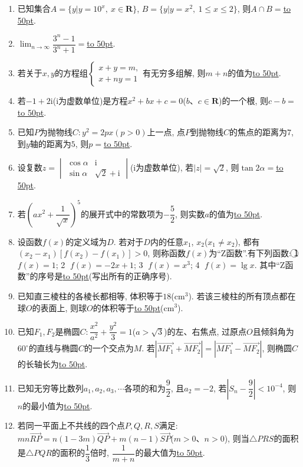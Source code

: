 \documentclass[10pt,a4paper]{article}
\newcommand{\blank}[1]{\underline{\hbox to #1pt{}}}
\begin{document}
\begin{enumerate}[1.]
\item 已知集合$A=\{y|y=10^x, \ x\in \mathbf{R}\}$, $B=\{y|y=x^2, \ 1\le x\le 2\}$, 则$A\cap B=$\blank{50}.
\item $\displaystyle\lim_{n\to\infty}\dfrac{3^n-1}{3^n+1}=$\blank{50}.
\item 若关于$x, y$的方程组$\begin{cases}x+y=m, \\ x+ny=1\end{cases}$有无穷多组解, 则$m+n$的值为\blank{50}.
\item 若$-1+2\mathrm{i}$($\mathrm{i}$为虚数单位)是方程$x^2+bx+c=0$($b$、$c\in \mathbf{R}$)的一个根, 则$c-b=$\blank{50}.
\item 已知$P$为抛物线$C:y^2=2px(p>0)$上一点, 点$P$到抛物线$C$的焦点的距离为$7$, 到$y$轴的距离为$5$, 则$p=$\blank{50}.
\item 设复数$z=\begin{vmatrix}\cos \alpha & \mathrm{i} \\ \sin \alpha  & \sqrt 2+\mathrm{i} \end{vmatrix}$($\mathrm{i}$为虚数单位), 若$|z|=\sqrt 2$, 则$\tan 2\alpha =$\blank{50}.
\item 若$(ax^2+\dfrac 1{\sqrt x})^{5}$的展开式中的常数项为$-\dfrac 5{2}$, 则实数$a$的值为\blank{50}.
\item 设函数$f(x)$的定义域为$D$. 若对于$D$内的任意$x_1$, $x_2$($x_1\ne x_2$), 都有$(x_2-x_1)[f(x_2)-f(x_1)]>0$, 则称函数$f(x)$为``Z函数''.有下列函数: \textcircled{1} $f(x)=1$; \textcircled{2} $f(x)=-2x+1$; \textcircled{3} $f(x)=x^3$; \textcircled{4} $f(x)=\lg x$. 其中``Z函数''的序号是\blank{50}(写出所有的正确序号).
\item 已知直三棱柱的各棱长都相等, 体积等于$18$($\text{cm}^3$). 若该三棱柱的所有顶点都在球$O$的表面上, 则球$O$的体积等于\blank{50}($\text{cm}^3$).
\item 已知$F_1,F_2$是椭圆$C:\dfrac{x^2}{a^2}+\dfrac{y^2}3=1$($a>\sqrt 3$)的左、右焦点, 过原点$O$且倾斜角为$60^\circ$的直线与椭圆$C$的一个交点为$M$. 若$|\overrightarrow{MF_1}+\overrightarrow{MF_2}|=|\overrightarrow{MF_1}-\overrightarrow{MF_2}|$, 则椭圆$C$的长轴长为\blank{50}.
\item 已知无穷等比数列$a_1,a_2,a_3,\cdots$各项的和为$\dfrac 92$, 且$a_2=-2$, 若$|S_n-\dfrac 92|<10^{-4}$, 则$n$的最小值为\blank{50}.
\item 若同一平面上不共线的四个点$P,Q,R,S$满足: $mn\overrightarrow{RP}=n(1-3m)\overrightarrow{QP}+m(n-1)\overrightarrow{SP}$($m>0$、$n>0$), 则当$\triangle PRS$的面积是$\triangle PQR$的面积的$\dfrac 13$倍时, $\dfrac1{m+n}$的最大值为\blank{50}.

\end{enumerate}
\end{document}
